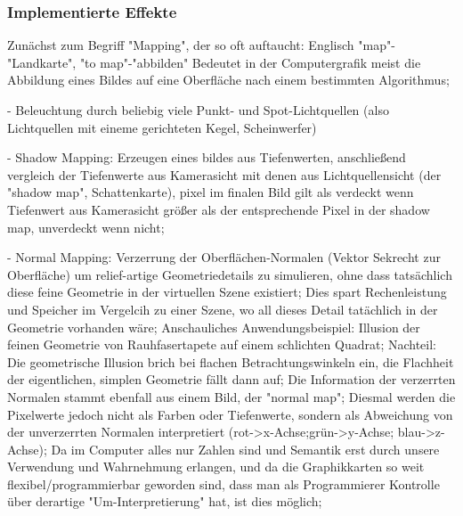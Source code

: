 	
\subsubsection{Implementierte Effekte}
	\label{sec:genericVisualEffects}

Zunächst zum Begriff "Mapping", der so oft auftaucht: Englisch "map"-"Landkarte", "to map"-"abbilden" Bedeutet in der Computergrafik meist die Abbildung eines Bildes auf eine Oberfläche nach einem bestimmten Algorithmus;

- Beleuchtung durch beliebig viele Punkt- und Spot-Lichtquellen (also Lichtquellen mit eineme gerichteten Kegel, Scheinwerfer)

- Shadow Mapping: Erzeugen eines bildes aus Tiefenwerten, anschließend vergleich der Tiefenwerte aus Kamerasicht mit denen aus Lichtquellensicht (der "shadow map", Schattenkarte), pixel im finalen Bild gilt als verdeckt wenn Tiefenwert aus Kamerasicht größer als der entsprechende Pixel in der shadow map, unverdeckt wenn nicht;

- Normal Mapping: Verzerrung der Oberflächen-Normalen (Vektor Sekrecht zur Oberfläche) um relief-artige Geometriedetails zu simulieren, ohne dass tatsächlich diese feine Geometrie in der virtuellen Szene existiert; Dies spart Rechenleistung und Speicher im Vergelcih zu einer Szene, wo all dieses Detail tatächlich in der Geometrie vorhanden wäre; Anschauliches Anwendungsbeispiel: Illusion der feinen Geometrie von Rauhfasertapete auf einem schlichten Quadrat; Nachteil: Die geometrische Illusion brich bei flachen Betrachtungswinkeln ein, die Flachheit der eigentlichen, simplen Geometrie fällt dann auf; Die Information der verzerrten Normalen stammt ebenfall aus einem Bild, der "normal map"; Diesmal werden die Pixelwerte jedoch nicht als Farben oder Tiefenwerte, sondern als Abweichung von der unverzerrten Normalen interpretiert (rot->x-Achse;grün->y-Achse; blau->z-Achse); Da im Computer alles nur Zahlen sind und Semantik erst durch unsere Verwendung und Wahrnehmung erlangen, und da die Graphikkarten so weit flexibel/programmierbar geworden sind, dass man als Programmierer Kontrolle über derartige "Um-Interpretierung" hat, ist dies möglich;

